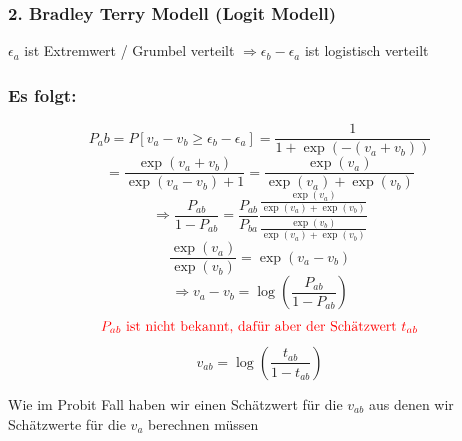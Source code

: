	\subsubsection*{2. Bradley Terry Modell (Logit Modell)}
		$ \epsilon_a $ ist Extremwert / Grumbel verteilt
		$ \Rightarrow \epsilon_b - \epsilon_a $ ist logistisch verteilt
	\subsubsection*{Es folgt:}
		\[ P_ab = P[v_a - v_b \geq \epsilon_b - \epsilon_a] = \frac{1}{1+ \exp(-(v_a + v_b))}\]
		\[ = \frac{\exp(v_a + v_b)}{\exp(v_a - v_b) +1} = \frac{\exp(v_a)}{\exp(v_a) + \exp(v_b)}  \]
		\[ \Rightarrow \frac{P_{ab}}{1- P_{ab}} = \frac{P_{ab}}{P_{ba}} \frac{\frac{\exp(v_a)}{\exp(v_a) + \exp(v_b)}}{\frac{\exp(v_b)}{\exp(v_a) + \exp(v_b)}} \]
		\[ \frac{\exp(v_a)}{\exp(v_b)} = \exp(v_a - v_b) \]
		\[ \Rightarrow v_a - v_b = \log(\frac{P_{ab}}{1- P_{ab}})\]
		\[\textcolor{red}{\text{$ P_{ab} $ ist nicht bekannt, dafür aber der Schätzwert $ t_{ab} $}}\]
		\[ v_{ab} = \log(\frac{t_{ab}}{1 - t_{ab}}) \]
		
		Wie im Probit Fall haben wir einen Schätzwert für die $ v_{ab} $ aus denen wir Schätzwerte für die $ v_a $ berechnen müssen

	
\egroup	
	
